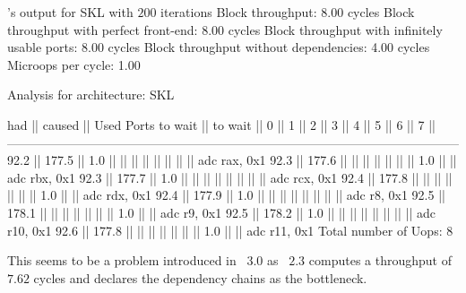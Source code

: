 \begin{LabeledExample}{\suaca's output for SKL with $200$ iterations}{\label{ex:3.0suaca}}
    Block throughput: 8.00 cycles
    Block throughput with perfect front-end: 8.00 cycles
    Block throughput with infinitely usable ports: 8.00 cycles
    Block throughput without dependencies: 4.00 cycles
    Microops per cycle: 1.00
    
    Analysis for architecture: SKL
    
        had   || caused  ||            Used Ports
      to wait || to wait ||   0   ||   1   ||   2   ||   3   ||   4   ||   5   ||   6   ||   7   ||
     ------------------------------------------------------------------------------------------------------------
       92.2   || 177.5   ||  1.0  ||       ||       ||       ||       ||       ||       ||       || adc rax, 0x1
       92.3   || 177.6   ||       ||       ||       ||       ||       ||       ||  1.0  ||       || adc rbx, 0x1
       92.3   || 177.7   ||  1.0  ||       ||       ||       ||       ||       ||       ||       || adc rcx, 0x1
       92.4   || 177.8   ||       ||       ||       ||       ||       ||       ||  1.0  ||       || adc rdx, 0x1
       92.4   || 177.9   ||  1.0  ||       ||       ||       ||       ||       ||       ||       || adc r8, 0x1
       92.5   || 178.1   ||       ||       ||       ||       ||       ||       ||  1.0  ||       || adc r9, 0x1
       92.5   || 178.2   ||  1.0  ||       ||       ||       ||       ||       ||       ||       || adc r10, 0x1
       92.6   || 177.8   ||       ||       ||       ||       ||       ||       ||  1.0  ||       || adc r11, 0x1
    Total number of Uops: 8
\end{LabeledExample}

This seems to be a problem introduced in \iaca\ $3.0$ as \iaca\ $2.3$ computes a throughput of $7.62$ cycles and declares the dependency chains as the bottleneck.
